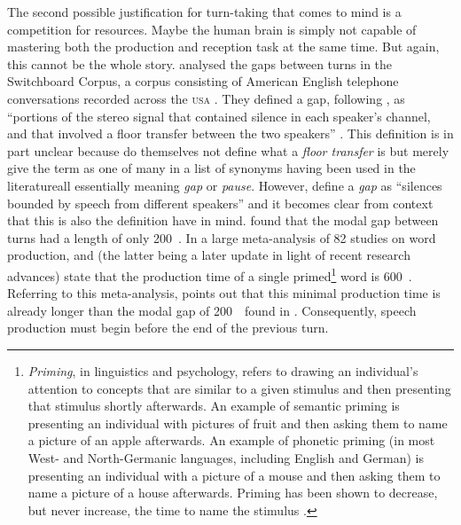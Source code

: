 The second possible justification for turn-taking that comes to mind is a competition for resources.
Maybe the human brain is simply not capable of mastering both the production and reception task at the same time.
But again, this cannot be the whole story.
\citet{levinson_timing_2015} analysed the gaps between turns in the Switchboard Corpus, a corpus consisting of American English telephone conversations recorded across the \textsc{usa} \citep{calhoun_nxt-format_2010,godfrey_switchboard_1992}.
They defined a gap, following \citet{heldner_pauses_2010}, as ``portions of the stereo signal that contained silence in each speaker's channel, and that involved a floor transfer between the two speakers'' \citep[]{levinson_timing_2015}.
This definition is in part unclear because \citet[]{heldner_pauses_2010} do themselves not define what a \emph{floor transfer} is but merely give the term as one of many in a list of synonyms having been used in the literature\dash all essentially meaning \emph{gap} or \emph{pause}.
However, \citet[]{heldner_pauses_2010} define a \emph{gap} as ``silences bounded by speech from different speakers'' and it becomes clear from context that this is also the definition \citet{levinson_timing_2015} have in mind.
\citet{levinson_timing_2015} found that the modal gap between turns had a length of only 200~\ms.
In a large meta-analysis of 82 studies on word production, \citet{indefrey_spatial_2004} and \citet{indefrey_spatial_2011} (the latter being a later update in light of recent research advances) state that the production time of a single primed\footnote{%
\emph{Priming}, in linguistics and psychology, refers to drawing an individual's attention to concepts that are similar to a given stimulus and then presenting that stimulus shortly afterwards.
An example of semantic priming is presenting an individual with pictures of fruit and then asking them to name a picture of an apple afterwards.
An example of phonetic priming (in most West- and North-Germanic languages, including English and German) is presenting an individual with a picture of a mouse and then asking them to name a picture of a house afterwards.
Priming has been shown to decrease, but never increase, the time to name the stimulus \citep[]{traxler_introduction_2012}.}
word is 600~\ms.
Referring to this meta-analysis, \citet{levinson_turn-taking_2016} points out that this minimal production time is already longer than the modal gap of 200~\ms\ found in \citet{levinson_timing_2015}.
Consequently, speech production must begin before the end of the previous turn.
